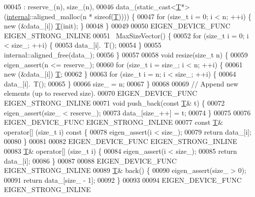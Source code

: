 \begin{DoxyCode}
00045       : reserve\_(n), size\_(n),
00046         data\_(static\_cast<\hyperlink{group___sparse_core___module_class_eigen_1_1_triplet}{T}*>(\hyperlink{namespaceinternal}{internal}::aligned\_malloc(n * sizeof(\hyperlink{group___sparse_core___module_class_eigen_1_1_triplet}{T})))) \{
00047     \textcolor{keywordflow}{for} (\textcolor{keywordtype}{size\_t} i = 0; i < n; ++i) \{ \textcolor{keyword}{new} (&data\_[i]) \hyperlink{group___sparse_core___module_class_eigen_1_1_triplet}{T}(init); \}
00048   \}
00049 
00050   EIGEN\_DEVICE\_FUNC EIGEN\_STRONG\_INLINE
00051   ~MaxSizeVector() \{
00052     \textcolor{keywordflow}{for} (\textcolor{keywordtype}{size\_t} i = 0; i < size\_; ++i) \{
00053       data\_[i].~T();
00054     \}
00055     internal::aligned\_free(data\_);
00056   \}
00057 
00058   \textcolor{keywordtype}{void} resize(\textcolor{keywordtype}{size\_t} n) \{
00059     eigen\_assert(n <= reserve\_);
00060     \textcolor{keywordflow}{for} (\textcolor{keywordtype}{size\_t} i = size\_; i < n; ++i) \{
00061       \textcolor{keyword}{new} (&data\_[i]) \hyperlink{group___sparse_core___module_class_eigen_1_1_triplet}{T};
00062     \}
00063     \textcolor{keywordflow}{for} (\textcolor{keywordtype}{size\_t} i = n; i < size\_; ++i) \{
00064       data\_[i].~T();
00065     \}
00066     size\_ = n;
00067   \}
00068 
00069   \textcolor{comment}{// Append new elements (up to reserved size).}
00070   EIGEN\_DEVICE\_FUNC EIGEN\_STRONG\_INLINE
00071   \textcolor{keywordtype}{void} push\_back(\textcolor{keyword}{const} \hyperlink{group___sparse_core___module_class_eigen_1_1_triplet}{T}& t) \{
00072     eigen\_assert(size\_ < reserve\_);
00073     data\_[size\_++] = t;
00074   \}
00075 
00076   EIGEN\_DEVICE\_FUNC EIGEN\_STRONG\_INLINE
00077   \textcolor{keyword}{const} \hyperlink{group___sparse_core___module_class_eigen_1_1_triplet}{T}& operator[] (\textcolor{keywordtype}{size\_t} i)\textcolor{keyword}{ const }\{
00078     eigen\_assert(i < size\_);
00079     \textcolor{keywordflow}{return} data\_[i];
00080   \}
00081 
00082   EIGEN\_DEVICE\_FUNC EIGEN\_STRONG\_INLINE
00083   \hyperlink{group___sparse_core___module_class_eigen_1_1_triplet}{T}& operator[] (\textcolor{keywordtype}{size\_t} i) \{
00084     eigen\_assert(i < size\_);
00085     \textcolor{keywordflow}{return} data\_[i];
00086   \}
00087 
00088   EIGEN\_DEVICE\_FUNC EIGEN\_STRONG\_INLINE
00089   \hyperlink{group___sparse_core___module_class_eigen_1_1_triplet}{T}& back() \{
00090     eigen\_assert(size\_ > 0);
00091     \textcolor{keywordflow}{return} data\_[size\_ - 1];
00092   \}
00093 
00094   EIGEN\_DEVICE\_FUNC EIGEN\_STRONG\_INLINE

\end{DoxyCode}
